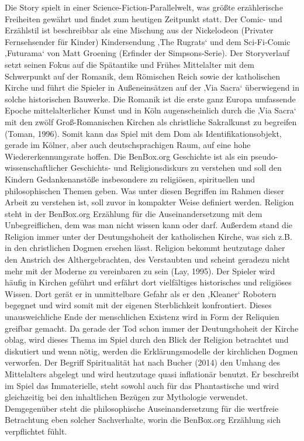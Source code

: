 \documentclass[
  a4paper,
  DIV=11,
  numbers=noendperiod,
  onecolumn,
  oneside,
  a4paper]{scrartcl}
\begin{document}
Die Story spielt in einer Science-Fiction-Parallelwelt, was größte
erzählerische Freiheiten gewährt und findet zum heutigen Zeitpunkt
statt. Der Comic- und Erzählstil ist beschreibbar als eine Mischung aus
der Nickelodeon (Privater Fernsehsender für Kinder) Kindersendung ‚The
Rugrats` und dem Sci-Fi-Comic ‚Futurama` von Matt Groening (Erfinder der
Simpsons-Serie). Der Storyverlauf setzt seinen Fokus auf die Spätantike
und Frühes Mittelalter mit dem Schwerpunkt auf der Romanik, dem
Römischen Reich sowie der katholischen Kirche und führt die Spieler in
Außeneinsätzen auf der ‚Via Sacra` überwiegend in solche historischen
Bauwerke. Die Romanik ist die erste ganz Europa umfassende Epoche
mittelalterlicher Kunst und in Köln augenscheinlich durch die ‚Via
Sacra` mit den zwölf Groß-Romanischen Kirchen als christliche
Sakralkunst zu begreifen (Toman, 1996). Somit kann das Spiel mit dem Dom
als Identifikationsobjekt, gerade im Kölner, aber auch deutschsprachigen
Raum, auf eine hohe Wiedererkennungsrate hoffen. Die BenBox.org
Geschichte ist als ein pseudo-wissenschaftlicher Geschichts- und
Religionsdiskurs zu verstehen und soll den Kindern Gedankenanstöße
insbesondere zu religiösen, spirituellen und philosophischen Themen
geben. Was unter diesen Begriffen im Rahmen dieser Arbeit zu verstehen
ist, soll zuvor in kompakter Weise definiert werden. Religion steht in
der BenBox.org Erzählung für die Auseinandersetzung mit dem
Unbegreiflichen, dem was man nicht wissen kann oder darf. Außerdem stand
die Religion immer unter der Deutungshoheit der katholischen Kirche, was
sich z.B. in den christlichen Dogmen ersehen lässt. Religion bekommt
heutzutage daher den Anstrich des Althergebrachten, des Verstaubten und
scheint geradezu nicht mehr mit der Moderne zu vereinbaren zu sein (Lay,
1995). Der Spieler wird häufig in Kirchen geführt und erfährt dort
vielfältiges historisches und religiöses Wissen. Dort gerät er in
unmittelbare Gefahr als er den ‚Kleaner` Robotern begegnet und wird
somit mit der eigenen Sterblichkeit konfrontiert. Dieses unausweichliche
Ende der menschlichen Existenz wird in Form der Reliquien greifbar
gemacht. Da gerade der Tod schon immer der Deutungshoheit der Kirche
oblag, wird dieses Thema im Spiel durch den Blick der Religion
betrachtet und diskutiert und wenn nötig, werden die Erklärungsmodelle
der kirchlichen Dogmen verworfen. Der Begriff Spiritualität hat nach
Bucher (2014) den Umhang des Mittelalters abgelegt und wird heutzutage
quasi inflationär benutzt. Er beschreibt im Spiel das Immaterielle,
steht sowohl auch für das Phantastische und wird gleichzeitig bei den
inhaltlichen Bezügen zur Mythologie verwendet. Demgegenüber steht die
philosophische Auseinandersetzung für die wertfreie Betrachtung eben
solcher Sachverhalte, worin die BenBox.org Erzählung sich verpflichtet
fühlt.
\end{document}

